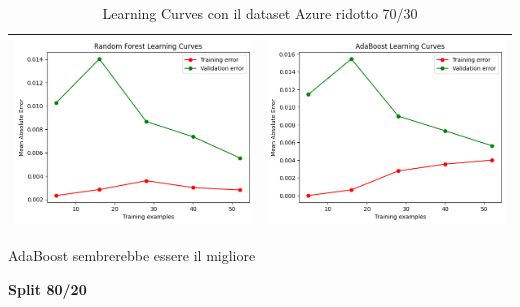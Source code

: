 \begin{table}[H]
\begin{tabularx}{\textwidth}{|X|X|}
        \includegraphics[width=\linewidth, trim=0 0 0 0]{images/RandomForest_lc70_ridottoAzure.png} &
        \includegraphics[width=\linewidth, trim=0 0 0 0]{images/AdaBoost_lc70_ridottoAzure.png} \\
        \hline
    \end{tabularx}
    \caption{Learning Curves con il dataset Azure ridotto 70/30}
    \label{tab:emissions_info}
\end{table}

\noindent AdaBoost sembrerebbe essere il migliore


\noindent\textbf{Split 80/20}


